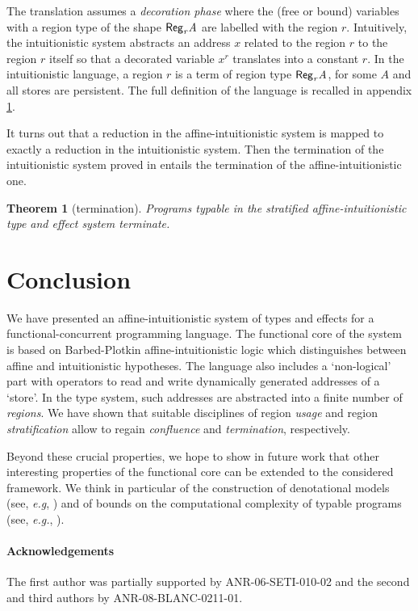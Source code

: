 \documentclass[11pt]{article}
\newtheorem{theorem}{Theorem}
\newcommand{\rgtype}[2]{{\it {\sf Reg}_{#1} #2}}
\begin{document}
The translation assumes a {\em decoration phase} where the (free or
bound) variables with a region type of the shape $\rgtype{r}{A}$ are
labelled with the region $r$. Intuitively, the intuitionistic system
abstracts an address $x$ related to the region $r$ to the
region $r$ itself so that a decorated variable $x^r$ translates into a
constant $r$. In the intuitionistic language, a region $r$ is a term of
region type $\rgtype{r}{A}$, for some $A$ and all stores are persistent.
The full definition of the language is recalled in
appendix \ref{termination-thm}.

It turns out that a reduction in the affine-intuitionistic system is
mapped to exactly a reduction in the intuitionistic system.  Then the
termination of the intuitionistic system proved in \cite{Amadio09}
entails the termination of the affine-intuitionistic one.


\begin{theorem}[termination]\label{termination-thm}
Programs typable in the stratified affine-intuitionistic 
type and effect system terminate.
\end{theorem}


\section{Conclusion}
We have presented an affine-intuitionistic system of types and effects for 
a functional-concurrent programming language. 
The functional core of the system is based on Barbed-Plotkin 
affine-intuitionistic logic which distinguishes between affine and
intuitionistic hypotheses. 
The language also includes a `non-logical' part with operators
to read and write dynamically generated addresses of a `store'. 
In the type system, such addresses are abstracted into a 
finite number of {\em regions}. We have shown that 
suitable disciplines of region {\em usage} and region {\em stratification}
allow to regain  {\em confluence} and {\em termination}, respectively.

Beyond these crucial properties, we hope to show in future 
work that other interesting properties of the functional core can be extended
to the considered framework. We think in particular of
the construction of denotational models (see, {\em e.g}, \cite{Bierman95})
and of bounds on the computational complexity of typable  programs 
(see, {\em e.g.}, \cite{Girard98}).


{\footnotesize
\paragraph{Acknowledgements}
The first author was partially supported by ANR-06-SETI-010-02 and the second and
third authors by ANR-08-BLANC-0211-01.}
\end{document}
